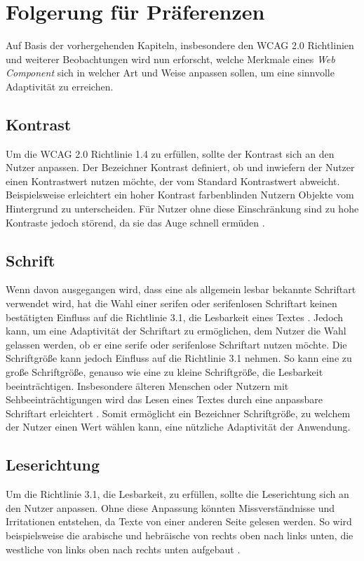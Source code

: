 \documentclass[12pt, paper=a4, bibtotoc, toc=listof, headsepline=true, numbers=endperiod]{scrreprt}
\begin{document}
\section{Folgerung für Präferenzen}
\label{sec:folFuePra}
Auf Basis der vorhergehenden Kapiteln, insbesondere den \ac{WCAG 2.0} Richtlinien und weiterer Beobachtungen wird nun erforscht, welche Merkmale eines \emph{Web Component} sich in welcher Art und Weise anpassen sollen, um eine sinnvolle Adaptivität zu erreichen.
\subsection{Kontrast}
Um die \ac{WCAG 2.0} Richtlinie 1.4 zu erfüllen, sollte der Kontrast sich an den Nutzer anpassen. Der Bezeichner Kontrast definiert, ob und inwiefern der Nutzer einen Kontrastwert nutzen möchte, der vom Standard Kontrastwert abweicht. Beispielsweise erleichtert ein hoher Kontrast farbenblinden Nutzern Objekte vom Hintergrund zu unterscheiden. Für Nutzer ohne diese Einschränkung sind zu hohe Kontraste jedoch störend, da sie das Auge schnell ermüden \cite[S.234]{balzert2009webdesign}.
\subsection{Schrift}
Wenn davon ausgegangen wird, dass eine als allgemein lesbar bekannte Schriftart verwendet wird, hat die Wahl einer serifen oder serifenlosen Schriftart keinen bestätigten Einfluss auf die Richtlinie 3.1, die Lesbarkeit eines Textes \cite[S.157-161]{barrierefreiheit}. Jedoch kann, um eine Adaptivität der Schriftart zu ermöglichen, dem Nutzer die Wahl gelassen werden, ob er eine serife oder serifenlose Schriftart nutzen möchte.
Die Schriftgröße kann jedoch Einfluss auf die Richtlinie 3.1 nehmen. So kann eine zu große Schriftgröße, genauso wie eine zu kleine Schriftgröße, die Lesbarkeit beeinträchtigen. Insbesondere älteren Menschen oder Nutzern mit Sehbeeinträchtigungen wird das Lesen eines Textes durch eine anpassbare Schriftart erleichtert \cite[S.152]{barrierefreiheit}. Somit ermöglicht ein Bezeichner Schriftgröße, zu welchem der Nutzer einen Wert wählen kann, eine nützliche Adaptivität der Anwendung. 
\subsection{Leserichtung}
\label{ref:lesRic}
Um die Richtlinie 3.1, die Lesbarkeit, zu erfüllen, sollte die Leserichtung sich an den Nutzer anpassen. Ohne diese Anpassung könnten Missverständnisse und Irritationen entstehen, da Texte von einer anderen Seite gelesen werden. So wird beispielsweise die arabische und hebräische von rechts oben nach links unten, die westliche von links oben nach rechts unten aufgebaut \cite[S.148]{emrich2013interkulturelles}.
\end{document}
